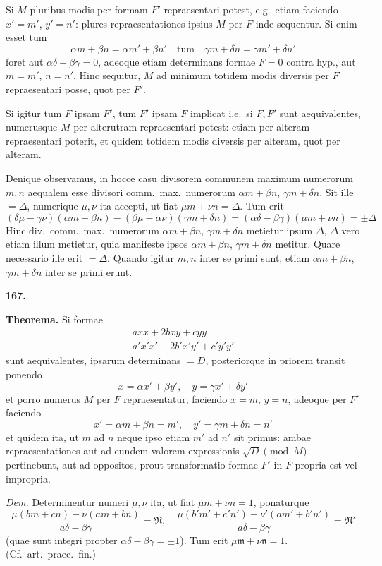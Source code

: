 \documentclass[12pt,a4paper]{article}
\theoremstyle{plain}
\theoremstyle{definition}
\theoremstyle{remark}
\begin{document}
Si $M$ pluribus modis per formam $F'$ repraesentari potest, e.g.\ etiam faciendo $x'=m'$, $y'=n'$: plures repraesentationes ipsius $M$ per $F$ inde sequentur. Si enim esset tum
\[\alpha m+\beta n=\alpha m'+\beta n'\quad\text{tum}\quad\gamma m+\delta n=\gamma m'+\delta n'\]
foret aut $\alpha\delta-\beta\gamma=0$, adeoque etiam determinans formae $F=0$ contra hyp., aut $m=m'$, $n=n'$. Hinc sequitur, $M$ ad minimum totidem modis diversis per $F$ repraesentari posse, quot per $F'$.

Si igitur tum $F$ ipsam $F'$, tum $F'$ ipsam $F$ implicat i.e.\ si $F,F'$ sunt aequivalentes, numerusque $M$ per alterutram repraesentari potest: etiam per alteram repraesentari poterit, et quidem totidem modis diversis per alteram, quot per alteram.

Denique observamus, in hocce casu divisorem communem maximum numerorum $m,n$ aequalem esse divisori comm.\ max.\ numerorum $\alpha m+\beta n$, $\gamma m+\delta n$. Sit ille $=\Delta$, numerique $\mu,\nu$ ita accepti, ut fiat $\mu m+\nu n=\Delta$. Tum erit
\[(\delta\mu-\gamma\nu)(\alpha m+\beta n)-(\beta\mu-\alpha\nu)(\gamma m+\delta n)=(\alpha\delta-\beta\gamma)(\mu m+\nu n)=\pm\Delta\]
Hinc div.\ comm.\ max.\ numerorum $\alpha m+\beta n$, $\gamma m+\delta n$ metietur ipsum $\Delta$, $\Delta$ vero etiam illum metietur, quia manifeste ipsos $\alpha m+\beta n$, $\gamma m+\delta n$ metitur. Quare necessario ille erit $=\Delta$. Quando igitur $m,n$ inter se primi sunt, etiam $\alpha m+\beta n$, $\gamma m+\delta n$ inter se primi erunt.

\textbf{167.}

\textbf{Theorema.} Si formae
\begin{gather*}
axx+2bxy+cyy\tag{$F$}\\
a'x'x'+2b'x'y'+c'y'y'\tag{$F'$}
\end{gather*}
sunt aequivalentes, ipsarum determinans $=D$, posteriorque in priorem transit ponendo
\[x=\alpha x'+\beta y',\quad y=\gamma x'+\delta y'\]
et porro numerus $M$ per $F$ repraesentatur, faciendo $x=m$, $y=n$, adeoque per $F'$ faciendo
\[x'=\alpha m+\beta n=m',\quad y'=\gamma m+\delta n=n'\]
et quidem ita, ut $m$ ad $n$ neque ipso etiam $m'$ ad $n'$ sit primus: ambae repraesentationes aut ad eundem valorem expressionis $\sqrt{D}\pmod{M}$ pertinebunt, aut ad oppositos, prout transformatio formae $F'$ in $F$ propria est vel impropria.

\textit{Dem.} Determinentur numeri $\mu,\nu$ ita, ut fiat $\mu m+\nu n=1$, ponaturque
\[\frac{\mu(bm+cn)-\nu(am+bn)}{a\delta-\beta\gamma}=\mathfrak{N},\quad \frac{\mu(b'm'+c'n')-\nu'(am'+b'n')}{a\delta-\beta\gamma}=\mathfrak{N}'\]
(quae sunt integri propter $\alpha\delta-\beta\gamma=\pm 1$). Tum erit $\mu\mathfrak{m}+\nu\mathfrak{n}=1$. (Cf.\ art.\ praec.\ fin.)
\end{document}
